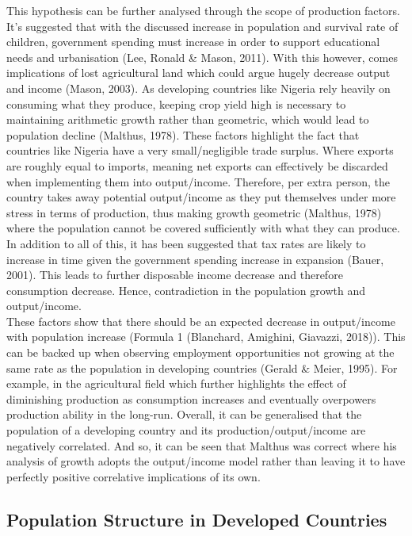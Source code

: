 \documentclass[11pt, english]{article}
\begin{document}
	This hypothesis can be further analysed through the scope of production factors. It’s suggested that with the discussed increase in population and survival rate of children, government spending must increase in order to support educational needs and urbanisation (Lee, Ronald \& Mason, 2011). With this however, comes implications of lost agricultural land which could argue hugely decrease output and income (Mason, 2003). As developing countries like Nigeria rely heavily on consuming what they produce, keeping crop yield high is necessary to maintaining arithmetic growth rather than geometric, which would lead to population decline (Malthus, 1978). These factors highlight the fact that countries like Nigeria have a very small/negligible trade surplus. Where exports are roughly equal to imports, meaning net exports can effectively be discarded when implementing them into output/income. Therefore, per extra person, the country takes away potential output/income as they put themselves under more stress in terms of production, thus making growth geometric (Malthus, 1978) where the population cannot be covered sufficiently with what they can produce. In addition to all of this, it has been suggested that tax rates are likely to increase in time given the government spending increase in expansion (Bauer, 2001). This leads to further disposable income decrease and therefore consumption decrease. Hence, contradiction in the population growth and output/income.\\

	These factors show that there should be an expected decrease in output/income with population increase (Formula 1 (Blanchard, Amighini, Giavazzi, 2018)). This can be backed up when observing employment opportunities not growing at the same rate as the population in developing countries (Gerald \& Meier, 1995). For example, in the agricultural field which further highlights the effect of diminishing production as consumption increases and eventually overpowers production ability in the long-run. Overall, it can be generalised that the population of a developing country and its production/output/income are negatively correlated. And so, it can be seen that Malthus was correct where his analysis of growth adopts the output/income model rather than leaving it to have perfectly positive correlative implications of its own.

	\newpage

	\subsection{Population Structure in Developed Countries}
\end{document}
